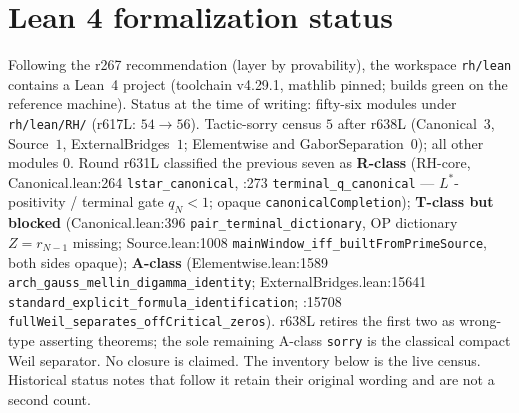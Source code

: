 \documentclass[11pt]{article}
\theoremstyle{definition}
\theoremstyle{remark}
\begin{document}
\section{Lean 4 formalization status}\label{sec:lean}

Following the r267 recommendation (layer by provability), the workspace
\texttt{rh/lean} contains a Lean~4 project (toolchain v4.29.1, mathlib
pinned; builds green on the reference machine).  Status at the time of
writing: fifty-six modules under \texttt{rh/lean/RH/} (r617L:
$54\to 56$).  Tactic-sorry
census $5$ after r638L (Canonical~$3$, Source~$1$,
ExternalBridges~$1$; Elementwise and GaborSeparation~$0$); all other
modules $0$.  Round r631L classified the previous seven as
\textbf{R-class} (RH-core, Canonical.lean:264 \texttt{lstar\_canonical},
:273 \texttt{terminal\_q\_canonical} --- $L^*$-positivity / terminal
gate $q_N<1$; opaque \texttt{canonicalCompletion});
\textbf{T-class but blocked} (Canonical.lean:396
\texttt{pair\_terminal\_dictionary}, OP dictionary $Z=r_{N-1}$ missing;
Source.lean:1008 \texttt{mainWindow\_iff\_builtFromPrimeSource}, both
sides opaque);
\textbf{A-class} (Elementwise.lean:1589
\texttt{arch\_gauss\_mellin\_digamma\_identity};
ExternalBridges.lean:15641
\texttt{standard\_explicit\_formula\_identification}; :15708
\texttt{fullWeil\_separates\_offCritical\_zeros}).  r638L retires the
first two as wrong-type asserting theorems; the sole remaining
A-class \texttt{sorry} is the classical compact Weil separator.
No closure is claimed.  The inventory below is the live census.  Historical status notes that
follow it retain their original wording and are not a second count.
\end{document}
